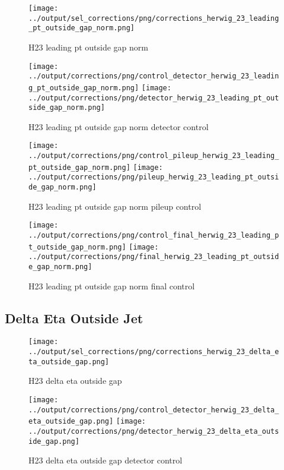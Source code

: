 \documentclass[11pt]{book}
\begin{document}
\begin{figure}[ht]
\centering
\texttt{[image: ../output/sel\_corrections/png/corrections\_herwig\_23\_leading\_pt\_outside\_gap\_norm.png]}
\caption{H23 leading pt outside gap norm}
\label{fig:H23_leading_pt_outside_gap_norm}
\end{figure}


\begin{figure}[ht]
\centering
\texttt{[image: ../output/corrections/png/control\_detector\_herwig\_23\_leading\_pt\_outside\_gap\_norm.png]}
\texttt{[image: ../output/corrections/png/detector\_herwig\_23\_leading\_pt\_outside\_gap\_norm.png]}
\caption{H23 leading pt outside gap norm detector control}
\label{fig:H23_leading_pt_outside_gap_norm_detector_control}
\end{figure}

\begin{figure}[ht]
\centering
\texttt{[image: ../output/corrections/png/control\_pileup\_herwig\_23\_leading\_pt\_outside\_gap\_norm.png]}
\texttt{[image: ../output/corrections/png/pileup\_herwig\_23\_leading\_pt\_outside\_gap\_norm.png]}
\caption{H23 leading pt outside gap norm pileup control}
\label{fig:H23_leading_pt_outside_gap_norm_pileup_control}
\end{figure}


\begin{figure}[ht]
\centering
\texttt{[image: ../output/corrections/png/control\_final\_herwig\_23\_leading\_pt\_outside\_gap\_norm.png]}
\texttt{[image: ../output/corrections/png/final\_herwig\_23\_leading\_pt\_outside\_gap\_norm.png]}
\caption{H23 leading pt outside gap norm final control}
\label{fig:H23_leading_pt_outside_gap_norm_final_control}
\end{figure}


\clearpage
\subsection{Delta Eta Outside Jet}
\begin{figure}[ht]
\centering
\texttt{[image: ../output/sel\_corrections/png/corrections\_herwig\_23\_delta\_eta\_outside\_gap.png]}
\caption{H23 delta eta outside gap}
\label{fig:H23_delta_eta_outside_gap}
\end{figure}


\begin{figure}[ht]
\centering
\texttt{[image: ../output/corrections/png/control\_detector\_herwig\_23\_delta\_eta\_outside\_gap.png]}
\texttt{[image: ../output/corrections/png/detector\_herwig\_23\_delta\_eta\_outside\_gap.png]}
\caption{H23 delta eta outside gap detector control}
\label{fig:H23_delta_eta_outside_gap_detector_control}
\end{figure}
\end{document}
